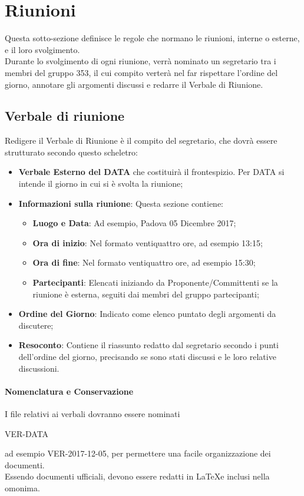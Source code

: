 \documentclass[NormeDiProgetto.tex]{subfiles}
\begin{document}
	\section{Riunioni}
	Questa sotto-sezione definisce le regole che normano le riunioni, interne o esterne, e il loro svolgimento.\\
	Durante lo svolgimento di ogni riunione, verrà nominato un segretario tra i membri del gruppo 353, il cui compito verterà nel far rispettare l'ordine del giorno, annotare gli argomenti discussi e redarre il Verbale di Riunione.
	\subsection{Verbale di riunione}
	Redigere il Verbale di Riunione è il compito del segretario, che dovrà essere strutturato secondo questo scheletro:
	\begin{itemize}
		\item \textbf{Verbale Esterno del DATA} che costituirà il frontespizio. Per DATA si intende il giorno in cui si è svolta la riunione;
		\item \textbf{Informazioni sulla riunione}: Questa sezione contiene:
		\begin{itemize}
			\item \textbf{Luogo e Data}: Ad esempio, Padova 05 Dicembre 2017;
			\item \textbf{Ora di inizio}: Nel formato ventiquattro ore, ad esempio 13:15;
			\item \textbf{Ora di fine}: Nel formato ventiquattro ore, ad esempio 15:30;
			\item \textbf{Partecipanti}: Elencati iniziando da Proponente/Committenti se la riunione è esterna, seguiti dai membri del gruppo partecipanti;
			\end{itemize}
			\item \textbf{Ordine del Giorno}: Indicato come elenco puntato degli argomenti da discutere;
			\item \textbf{Resoconto}: Contiene il riassunto redatto dal segretario secondo i punti dell'ordine del giorno, precisando se sono stati discussi e le loro relative discussioni.

	\end{itemize}
	\paragraph{Nomenclatura e Conservazione} I file relativi ai verbali dovranno essere nominati
	\begin{center}
		VER-DATA
	\end{center}
	ad esempio VER-2017-12-05, per permettere una facile organizzazione dei documenti.\\
	Essendo documenti ufficiali, devono essere redatti in \LaTeX e inclusi nella  omonima.
	
\end{document}

